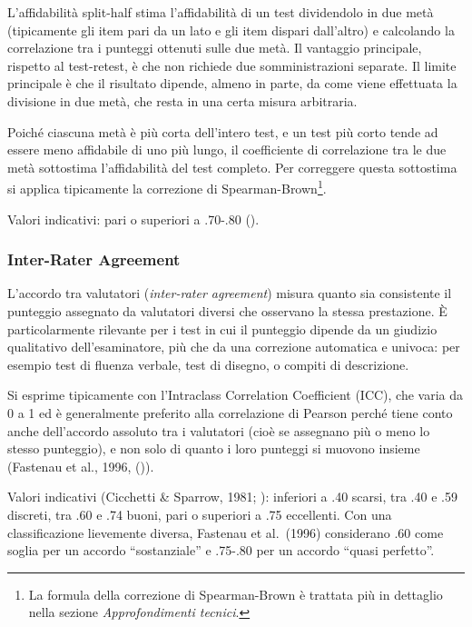 \documentclass[
  italian,
  letterpaper,
  paper=6in:9in,
  pagesize=pdftex,
  headinclude=on,
  footinclude=on,
  11pt]{scrbook}
\begin{document}
L'affidabilità split-half stima l'affidabilità di un test dividendolo in
due metà (tipicamente gli item pari da un lato e gli item dispari
dall'altro) e calcolando la correlazione tra i punteggi ottenuti sulle
due metà. Il vantaggio principale, rispetto al test-retest, è che non
richiede due somministrazioni separate. Il limite principale è che il
risultato dipende, almeno in parte, da come viene effettuata la
divisione in due metà, che resta in una certa misura arbitraria.

Poiché ciascuna metà è più corta dell'intero test, e un test più corto
tende ad essere meno affidabile di uno più lungo, il coefficiente di
correlazione tra le due metà sottostima l'affidabilità del test
completo. Per correggere questa sottostima si applica tipicamente la
correzione di Spearman-Brown\footnote{La formula della correzione di
  Spearman-Brown è trattata più in dettaglio nella sezione
  \emph{Approfondimenti tecnici}.}.

Valori indicativi: pari o superiori a .70-.80
(\cite{slick2006psychometrics}).

\subsubsection{Inter-Rater Agreement}\label{inter-rater-agreement}

L'accordo tra valutatori (\emph{inter-rater agreement}) misura quanto
sia consistente il punteggio assegnato da valutatori diversi che
osservano la stessa prestazione. È particolarmente rilevante per i test
in cui il punteggio dipende da un giudizio qualitativo dell'esaminatore,
più che da una correzione automatica e univoca: per esempio test di
fluenza verbale, test di disegno, o compiti di descrizione.

Si esprime tipicamente con l'Intraclass Correlation Coefficient (ICC),
che varia da 0 a 1 ed è generalmente preferito alla correlazione di
Pearson perché tiene conto anche dell'accordo assoluto tra i valutatori
(cioè se assegnano più o meno lo stesso punteggio), e non solo di quanto
i loro punteggi si muovono insieme (Fastenau et al., 1996,
(\cite{slick2006psychometrics})).

Valori indicativi (Cicchetti \& Sparrow, 1981;
\cite{slick2006psychometrics}): inferiori a .40 scarsi, tra .40 e .59
discreti, tra .60 e .74 buoni, pari o superiori a .75 eccellenti. Con
una classificazione lievemente diversa, Fastenau et al.~(1996)
considerano .60 come soglia per un accordo ``sostanziale'' e .75-.80 per
un accordo ``quasi perfetto''.
\end{document}
